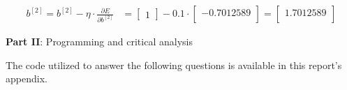 \documentclass[12pt]{article}
\begin{document}
\begin{enumerate}[leftmargin=\labelsep]
        \begin{equation*}
          \begin{aligned}
            b^{[2]} = b^{[2]} - \eta \cdot \frac{\partial E}{\partial b^{[2]}}
             & = \begin{bmatrix}
                   1
                 \end{bmatrix} - 0.1 \cdot \begin{bmatrix}
                                             -0.7012589 \\
                                           \end{bmatrix} = \begin{bmatrix}
                                                             1.7012589 \\
                                                           \end{bmatrix}
          \end{aligned}
        \end{equation*}

\end{enumerate}

\pagebreak

\center\large{\textbf{Part II}: Programming and critical analysis}

\begin{justify}
  The code utilized to answer the following questions is available in this
  report's appendix.
\end{justify}
\end{document}
